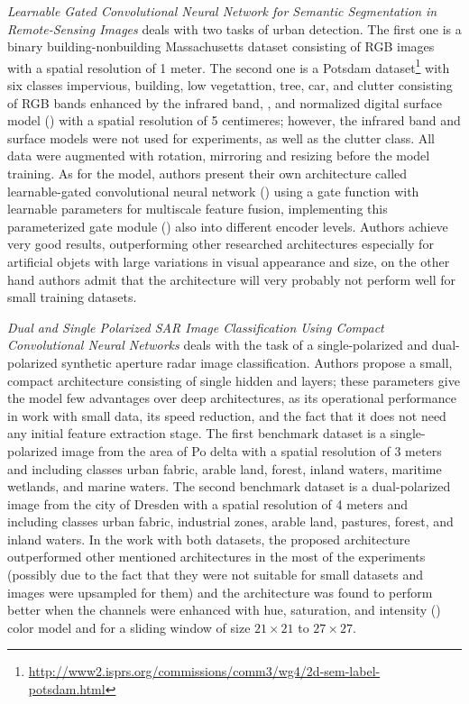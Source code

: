 \textit{Learnable Gated Convolutional Neural Network for Semantic Segmentation in Remote-Sensing Images} deals with two tasks of urban detection. The first one is a binary building-nonbuilding Massachusetts dataset \cite{massachusetts-dataset} consisting of RGB images with a spatial resolution of 1 meter. The second one is a Potsdam dataset\footnote{\url{http://www2.isprs.org/commissions/comm3/wg4/2d-sem-label-potsdam.html}} with six classes impervious, building, low vegetattion, tree, car, and clutter consisting of RGB bands enhanced by the infrared band, , and normalized digital surface model () with a spatial resolution of 5 centimeres; however, the infrared band and surface models were not used for experiments, as well as the clutter class. All data were augmented with rotation, mirroring and resizing before the model training. As for the model, authors present their own architecture called learnable-gated convolutional neural network () using a gate function with learnable parameters for multiscale feature fusion, implementing this parameterized gate module () also into different encoder levels. Authors achieve very good results, outperforming other researched architectures especially for artificial objets with large variations in visual appearance and size, on the other hand authors admit that the architecture will very probably not perform well for small training datasets.

\textit{Dual and Single Polarized SAR Image Classification Using Compact Convolutional Neural Networks} deals with the task of a single-polarized and dual-polarized synthetic aperture radar  image classification. Authors propose a small, compact  architecture consisting of single hidden  and  layers; these parameters give the model few advantages over deep architectures, as its operational performance in work with small data, its speed reduction, and the fact that it does not need any initial feature extraction stage. The first benchmark dataset is a single-polarized  image from the area of Po delta with a spatial resolution of 3 meters and including classes urban fabric, arable land, forest, inland waters, maritime wetlands, and marine waters. The second benchmark dataset is a dual-polarized  image from the city of Dresden with a spatial resolution of 4 meters and including classes urban fabric, industrial zones, arable land, pastures, forest, and inland waters. In the work with both datasets, the proposed architecture outperformed other mentioned architectures in the most of the experiments (possibly due to the fact that they were not suitable for small datasets and images were upsampled for them) and the architecture was found to perform better when the channels were enhanced with hue, saturation, and intensity () color model and for a sliding window of size $21 \times 21$ to $27 \times 27$.

